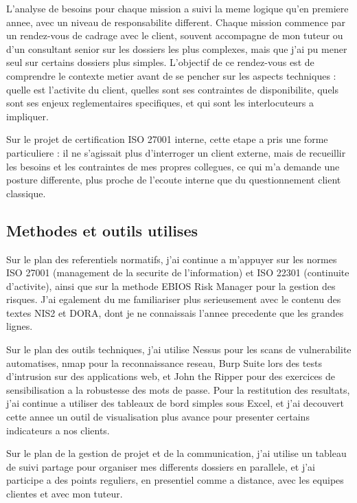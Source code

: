 \documentclass[11pt,a4paper]{article}
\begin{document}
L'analyse de besoins pour chaque mission a suivi la meme logique qu'en premiere annee, avec un niveau de responsabilite different. Chaque mission commence par un rendez-vous de cadrage avec le client, souvent accompagne de mon tuteur ou d'un consultant senior sur les dossiers les plus complexes, mais que j'ai pu mener seul sur certains dossiers plus simples. L'objectif de ce rendez-vous est de comprendre le contexte metier avant de se pencher sur les aspects techniques : quelle est l'activite du client, quelles sont ses contraintes de disponibilite, quels sont ses enjeux reglementaires specifiques, et qui sont les interlocuteurs a impliquer.

Sur le projet de certification ISO 27001 interne, cette etape a pris une forme particuliere : il ne s'agissait plus d'interroger un client externe, mais de recueillir les besoins et les contraintes de mes propres collegues, ce qui m'a demande une posture differente, plus proche de l'ecoute interne que du questionnement client classique.

\subsection{Methodes et outils utilises}

Sur le plan des referentiels normatifs, j'ai continue a m'appuyer sur les normes ISO 27001 (management de la securite de l'information) et ISO 22301 (continuite d'activite), ainsi que sur la methode EBIOS Risk Manager pour la gestion des risques. J'ai egalement du me familiariser plus serieusement avec le contenu des textes NIS2 et DORA, dont je ne connaissais l'annee precedente que les grandes lignes.

Sur le plan des outils techniques, j'ai utilise Nessus pour les scans de vulnerabilite automatises, nmap pour la reconnaissance reseau, Burp Suite lors des tests d'intrusion sur des applications web, et John the Ripper pour des exercices de sensibilisation a la robustesse des mots de passe. Pour la restitution des resultats, j'ai continue a utiliser des tableaux de bord simples sous Excel, et j'ai decouvert cette annee un outil de visualisation plus avance pour presenter certains indicateurs a nos clients.

Sur le plan de la gestion de projet et de la communication, j'ai utilise un tableau de suivi partage pour organiser mes differents dossiers en parallele, et j'ai participe a des points reguliers, en presentiel comme a distance, avec les equipes clientes et avec mon tuteur.
\end{document}

